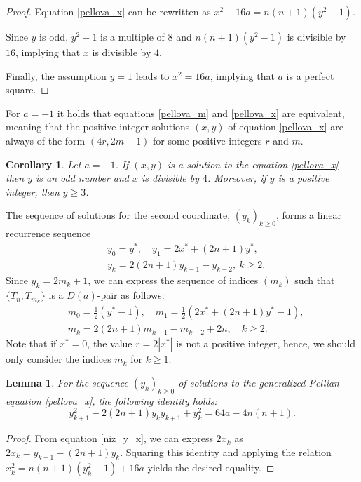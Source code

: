 \documentclass[12pt]{amsart}
\newtheorem{lemma}[theorem]{Lemma}
\newtheorem{kor}[theorem]{Corollary}
\theoremstyle{definition}
\begin{document}
\begin{proof} 
Equation \eqref{pellova_x} can be rewritten as $x^2 - 16a = n(n+1)(y^2 - 1)$. 

Since $y$ is odd, $y^2 - 1$ is a multiple of $8$ and $n(n+1)(y^2 - 1)$ is divisible by $16$, implying that $x$ is divisible by $4$.

Finally,  the assumption $y=1$ leads to $x^2 = 16a$, implying that $a$ is a perfect square. 
\end{proof}

For $a=-1$ it holds that equations \eqref{pellova_m} and \eqref{pellova_x} are equivalent, meaning that the positive integer solutions $(x,y)$ of equation \eqref{pellova_x} are always of the form $(4r,2m+1)$ for some positive integers $r$ and $m$.  

\begin{kor}\label{kor_svojstva_xy_minus_1}
    Let $a=-1$. If $(x,y)$ is a solution to the equation \eqref{pellova_x} then $y$ is an odd number and $x$ is divisible by $4$. Moreover, if $y$ is a positive integer, then $y\geq 3$. 
\end{kor}


The sequence of solutions for the second coordinate, $(y_k)_{k \geq 0}$, forms a linear recurrence sequence 
\begin{align}\label{eq_rek_y}
&y_0=y^*,\quad y_1=2x^*+(2n+1)y^*,\nonumber\\
&y_{k}=2(2n+1)y_{k-1}-y_{k-2},\ k \geq 2.
\end{align}
Since $y_k=2m_k+1$, we can express the sequence of indices $(m_k)$ such that $\{T_n,T_{m_k}\}$ is a $D(a)$-pair as follows:
\begin{align}\label{eq_niz_mk}
&m_0=\frac{1}{2}(y^*-1),\quad m_1=\frac{1}{2}(2x^*+(2n+1)y^*-1),\nonumber\\
 &m_{k}=2(2n+1)m_{k-1}-m_{k-2}+2n,\quad k\geq 2.
\end{align}
Note that if $x^* =0$, the value $r=2|x^*|$ is not a positive integer, hence, we should only consider the indices $m_k$ for $k \geq 1$.

\begin{lemma}\label{lem_y}
    For the sequence $(y_k)_{k \geq 0}$ of solutions to the generalized Pellian equation \eqref{pellova_x}, the following identity holds:
$$y_{k+1}^2 - 2(2n+1)y_k y_{k+1} + y_k^2 =  64a - 4n(n+1).$$
\end{lemma}
\begin{proof}
From equation \eqref{niz_y_x}, we can express $2x_k$ as $2x_k = y_{k+1} - (2n+1)y_k$. Squaring this identity and applying the relation $x_k^2=n(n+1)(y_k^2-1)+16a$ yields the desired equality. 
\end{proof}
\end{document}
